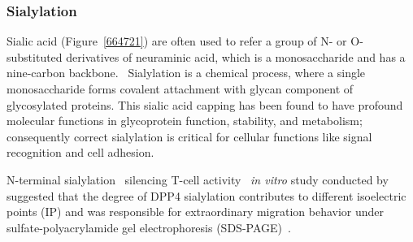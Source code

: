 \subsubsection {Sialylation}
Sialic acid (Figure~\ref{664721}) are often used to refer a group of N- or O-substituted derivatives of neuraminic acid, which is a monosaccharide and has a nine-carbon backbone.~\cite{Vocadlo_2009} Sialylation is a chemical process, where a single monosaccharide forms covalent attachment with glycan component of glycosylated proteins. This sialic acid capping has been found to have profound molecular functions in glycoprotein function, stability, and metabolism; consequently correct sialylation is critical for cellular functions like signal recognition and cell adhesion.~\cite{Bhide_2016}
\par 
N-terminal sialylation~\cite{Stehling_1999}
silencing T-cell activity~\cite{K_hne_1996} 
\textit{in vitro} study conducted by~\citet{Schmauser1999} suggested that the degree of DPP4 sialylation contributes to different isoelectric points (IP) and was responsible for extraordinary migration behavior under sulfate-polyacrylamide gel electrophoresis (SDS-PAGE)~.